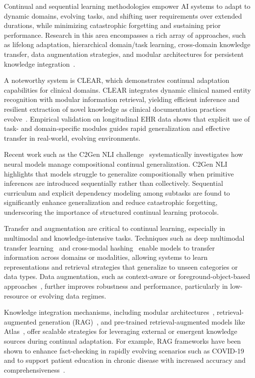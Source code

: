 \documentclass[sigconf]{acmart}
\begin{document}
Continual and sequential learning methodologies empower AI systems to adapt to dynamic domains, evolving tasks, and shifting user requirements over extended durations, while minimizing catastrophic forgetting and sustaining prior performance. Research in this area encompasses a rich array of approaches, such as lifelong adaptation, hierarchical domain/task learning, cross-domain knowledge transfer, data augmentation strategies, and modular architectures for persistent knowledge integration~\cite{ref7,ref18,ref19,ref20,ref21,ref22,ref23,ref24,ref26,ref29,ref30,ref46,ref54,ref55,ref61,ref62,ref64}.

A noteworthy system is CLEAR, which demonstrates continual adaptation capabilities for clinical domains. CLEAR integrates dynamic clinical named entity recognition with modular information retrieval, yielding efficient inference and resilient extraction of novel knowledge as clinical documentation practices evolve~\cite{ref7}. Empirical validation on longitudinal EHR data shows that explicit use of task- and domain-specific modules guides rapid generalization and effective transfer in real-world, evolving environments.

Recent work such as the C2Gen NLI challenge~\cite{ref18,ref46} systematically investigates how neural models manage compositional continual generalization. C2Gen NLI highlights that models struggle to generalize compositionally when primitive inferences are introduced sequentially rather than collectively. Sequential curriculum and explicit dependency modeling among subtasks are found to significantly enhance generalization and reduce catastrophic forgetting, underscoring the importance of structured continual learning protocols.

Transfer and augmentation are critical to continual learning, especially in multimodal and knowledge-intensive tasks. Techniques such as deep multimodal transfer learning~\cite{ref19} and cross-modal hashing~\cite{ref20} enable models to transfer information across domains or modalities, allowing systems to learn representations and retrieval strategies that generalize to unseen categories or data types. Data augmentation, such as context-aware or foreground-object-based approaches~\cite{ref61,ref62}, further improves robustness and performance, particularly in low-resource or evolving data regimes.

Knowledge integration mechanisms, including modular architectures~\cite{ref7,ref29}, retrieval-augmented generation (RAG)~\cite{ref54,ref55,ref64}, and pre-trained retrieval-augmented models like Atlas~\cite{ref22}, offer scalable strategies for leveraging external or emergent knowledge sources during continual adaptation. For example, RAG frameworks have been shown to enhance fact-checking in rapidly evolving scenarios such as COVID-19~\cite{ref54} and to support patient education in chronic disease with increased accuracy and comprehensiveness~\cite{ref55}.
\end{document}
